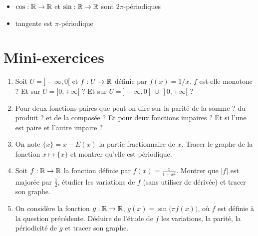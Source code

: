 \begin{frame}



\begin{exemple}
\begin{itemize}
  \item $\cos :\mathbb{R}\to\mathbb{R}$ et $\sin :\mathbb{R}\to\mathbb{R}$ sont $2\pi$-périodiques
  \item tangente est $\pi$-périodique
\end{itemize}
\end{exemple}

\bigskip



\end{frame}


\section{Mini-exercices}

\begin{frame}

\begin{miniexercice}
\begin{enumerate}
  \item Soit $U=]-\infty,0[$ et $f : U \to \mathbb{R}$ définie par $f(x)= 1/x$. $f$ est-elle  monotone ?
  Et sur $U=]0,+\infty[$ ? Et sur $U = ]-\infty,0[\,\cup \, ]0,+\infty[$ ?
  
  \item Pour deux fonctions paires que peut-on dire sur la parité de la somme ? du produit ? et de la 
  composée ? Et pour deux fonctions impaires ? Et si l'une est paire et l'autre impaire ?
  
  \item On note $\{x\}=x-E(x)$ la partie fractionnaire de $x$. 
  Tracer le graphe de la fonction $x\mapsto\{x\}$ et montrer qu'elle est périodique.
  
  \item Soit $f:\mathbb{R}\to\mathbb{R}$ la fonction définie par $f(x)=\frac{x}{1+x^2}$. 
  Montrer que $|f|$ est majorée par $\frac12$, étudier les variations de $f$ 
  (sans utiliser de dérivée) et tracer son graphe.
  
  \item On considère la fonction $g:\mathbb{R}\to\mathbb{R}$, $g(x)=\sin\big(\pi f(x)\big)$, 
  où $f$ est définie à la question précédente. Déduire de l'étude de $f$ les variations, 
  la parité, la périodicité de $g$ et tracer son graphe.
\end{enumerate}
\end{miniexercice}

\end{frame}

